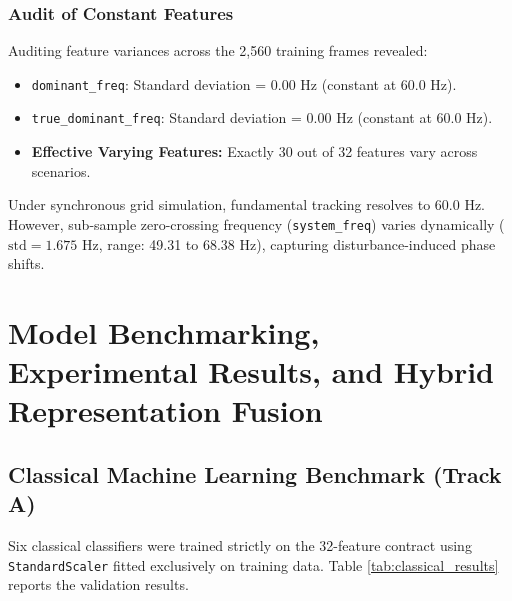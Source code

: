 \documentclass[12pt,a4paper]{report}
\begin{document}
\subsection{Audit of Constant Features}
Auditing feature variances across the 2,560 training frames revealed:
\begin{itemize}
    \item \texttt{dominant\_freq}: Standard deviation = $0.00\text{ Hz}$ (constant at $60.0\text{ Hz}$).
    \item \texttt{true\_dominant\_freq}: Standard deviation = $0.00\text{ Hz}$ (constant at $60.0\text{ Hz}$).
    \item \textbf{Effective Varying Features:} Exactly 30 out of 32 features vary across scenarios.
\end{itemize}
Under synchronous grid simulation, fundamental tracking resolves to 60.0 Hz. However, sub-sample zero-crossing frequency (\texttt{system\_freq}) varies dynamically ($\text{std} = 1.675\text{ Hz}$, range: 49.31 to 68.38 Hz), capturing disturbance-induced phase shifts.

\chapter{Model Benchmarking, Experimental Results, and Hybrid Representation Fusion}

\section{Classical Machine Learning Benchmark (Track A)}
Six classical classifiers were trained strictly on the 32-feature contract using \texttt{StandardScaler} fitted exclusively on training data. Table \ref{tab:classical_results} reports the validation results.
\end{document}
